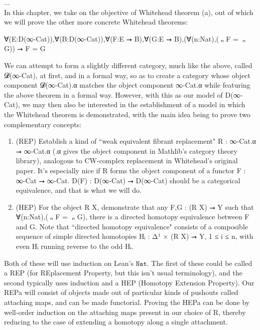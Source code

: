 \documentclass{book}
\theoremstyle{definition}
\begin{document}
...\\


In this chapter, we take on the objective of Whitehead theorem (a), out of which we will prove the other more concrete Whitehead theorems:\\

\begin{center} ∀(E:D(∞-Cat)),∀(B:D(∞-Cat)),∀(F:E ⭢ B),∀(G:E ⭢ B),(∀(n:Nat),(π⃗ₙ F = π⃗ₙ G)) ⭢ F = G
\end{center}

We can attempt to form a slightly different category, much like the above, called 𝓓(∞-Cat), at first, and in a formal way, so as to create a category whose object component 𝓓(∞-Cat).α matches the object component ∞-Cat.α while featuring the above theorem in a formal way. However, with this as our model of D(∞-Cat), we may then also be interested in the establishment of a model in which the Whitehead theorem is demonstrated, with the main idea being to prove two complementary concepts:

\begin{enumerate}
\item (REP) Establish a kind of ``weak equivalent fibrant replacement" R : ∞-Cat.α ⭢ ∞-Cat.α (.α gives the object component in Mathlib's category theory library), analogous to CW-complex replacement in Whitehead's original paper. It's especially nice if R forms the object component of a functor F : ∞-Cat ⭢ ∞-Cat. D(F) : D(∞-Cat) ⭢ D(∞-Cat) should be a categorical equivalence, and that is what we will do.
\item (HEP) For the object R X, demonstrate that any F,G : (R X) ⭢ Y such that ∀(n:Nat),(π⃗ₙ F = π⃗ₙ G), there is a directed homotopy equivalence between F and G. Note that ``directed homotopy equivalence" consists of a composible sequence of simple directed homotopies Hᵢ : Δ¹ × (R X) ⭢ Y, 1 ≤ i ≤ n, with even Hᵢ running reverse to the odd Hᵢ.
\end{enumerate} 

Both of these will use induction on Lean's $\texttt{Nat}$. The first of these could be called a REP (for REplacement Property, but this isn't usual terminology), and the second typically uses induction and a HEP (Homotopy Extension Property). Our REPa will consist of objects made out of particular kinds of pushouts called attaching maps, and can be made functorial. Proving the HEPa can be done by well-order induction on the attaching maps present in our choice of R, thereby reducing to the case of extending a homotopy along a single attachment.\\
\end{document}
